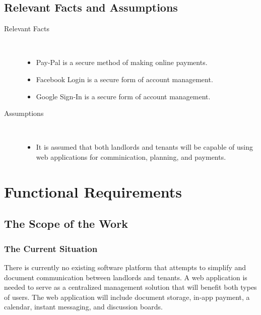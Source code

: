 \documentclass[12pt, titlepage]{article}
\begin{document}
\subsection{Relevant Facts and Assumptions} %
\begin{description}
  \item[Relevant Facts] \hfill \\
  \begin{itemize}
    \item Pay-Pal is a secure method of making online payments.
    \item Facebook Login is a secure form of account management.
    \item Google Sign-In is a secure form of account management.
  \end{itemize}
  \item[Assumptions] \hfill \\
  \begin{itemize}
  \item  It is assumed that both landlords and tenants will be capable of using
    web applications for comminication, planning, and payments.
  \end{itemize}
\end{description}  

\section{Functional Requirements} 
\subsection{The Scope of the Work}
\subsubsection{The Current Situation}
There is currently no existing software platform that attempts to simplify and document communication between landlords and tenants. A web application is needed to serve as a centralized management solution that will benefit both types of users. The web application will include document storage, in-app payment, a calendar, instant messaging, and discussion boards.  
\end{document}
